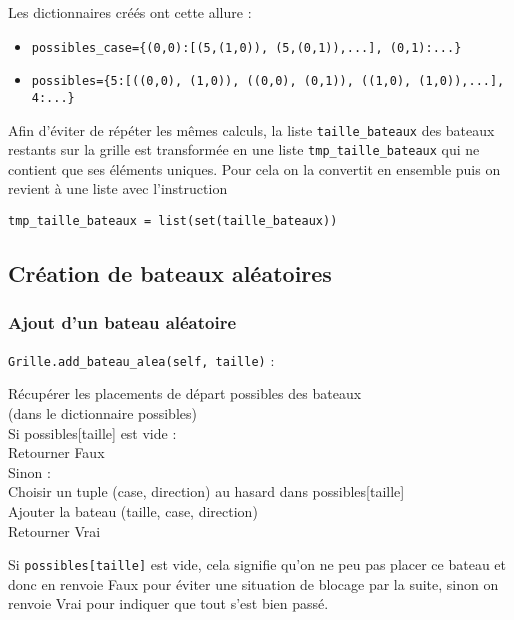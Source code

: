 Les dictionnaires créés ont cette allure :
\begin{itemize}
\item \texttt{possibles\_case=\{(0,0):[(5,(1,0)), (5,(0,1)),...], (0,1):...\}}
\item \texttt{possibles=\{5:[((0,0), (1,0)), ((0,0), (0,1)), ((1,0), (1,0)),...], 4:...\}}
\end{itemize}

\medskip

Afin d'éviter de répéter les mêmes calculs, la liste \texttt{taille\_bateaux} des bateaux restants sur la grille est transformée en une liste \texttt{tmp\_taille\_bateaux} qui ne contient que ses éléments uniques. Pour cela on la convertit en ensemble puis on revient à une liste avec l'instruction 
\begin{center}
\texttt{tmp\_taille\_bateaux = list(set(taille\_bateaux))}
\end{center}

\newpage

\subsection{Création de bateaux aléatoires}
\subsubsection{Ajout d'un bateau aléatoire}\label{add_bateau_alea}
\texttt{Grille.add\_bateau\_alea(self, taille)} :
\begin{algo1}
Récupérer les placements de départ possibles des bateaux\\
(dans le dictionnaire possibles)\\
Si possibles[taille] est vide :\\
Retourner Faux\\
Sinon :\\
Choisir un tuple (case, direction) au hasard dans possibles[taille]\\
Ajouter la bateau (taille, case, direction)\\
Retourner Vrai\\ 
\end{algo1}

Si \texttt{possibles[taille]} est vide, cela signifie qu'on ne peu pas placer ce bateau et donc en renvoie Faux pour éviter une situation de blocage par la suite, sinon on renvoie Vrai pour indiquer que tout s'est bien passé.

